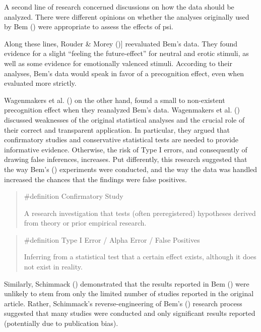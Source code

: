 \documentclass[
  letterpaper,
]{book}
\begin{document}
A second line of research concerned discussions on how the data should
be analyzed. There were different opinions on whether the analyses
originally used by Bem () were
appropriate to assess the effects of psi.

Along these lines, Rouder \& Morey
(){]} reevaluated Bem's data. They
found evidence for a slight ``feeling the future-effect'' for neutral
and erotic stimuli, as well as some evidence for emotionally valenced
stimuli. According to their analyses, Bem's data would speak in favor of
a precognition effect, even when evaluated more strictly.

Wagenmakers et al.
() on the other hand, found a small to non-existent
precognition effect when they reanalyzed Bem's data. Wagenmakers et al.
()
discussed weaknesses of the original statistical analyses and the
crucial role of their correct and transparent application. In
particular, they argued that confirmatory studies and conservative
statistical tests are needed to provide informative evidence. Otherwise,
the risk of Type I errors, and consequently of drawing false inferences,
increases. Put differently, this research suggested that the way Bem's
() experiments were conducted, and
the way the data was handled increased the chances that the findings
were false positives.

\begin{quote}
\label{def-confirmatorystudy}{\#definition} Confirmatory
Study

A research investigation that tests (often preregistered) hypotheses
derived from theory or prior empirical research.
\end{quote}

\begin{quote}
\label{def-typeIerror}{\#definition} Type I Error / Alpha
Error / False Positives

Inferring from a statistical test that a certain effect exists, although
it does not exist in reality.
\end{quote}

Similarly, Schimmack () demonstrated
that the results reported in Bem ()
were unlikely to stem from only the limited number of studies reported
in the original article. Rather, Schimmack's reverse-engineering of
Bem's () research process suggested
that many studies were conducted and only significant results reported
(potentially due to publication bias).
\end{document}

